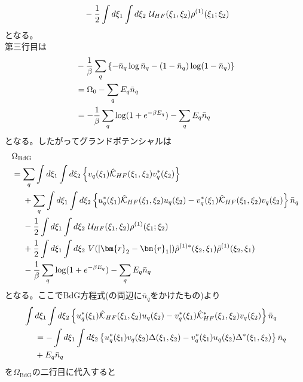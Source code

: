 \documentclass[dvipdfmx, 11pt, a4paper]{jsarticle}
\numberwithin{equation}{section}
\theoremstyle{definition}
\begin{document}
\begin{derivationBox}
\begin{align}
            &\ \ \ \ - \frac{1}{2}\int d\xi_1\int d\xi_2\ \mathcal{U}_{HF}(\xi_1,\xi_2)\rho^{(1)}(\xi_1;\xi_2) \notag 
        \end{align}
        となる。\\
        第三行目は
        \begin{align}
            &- \frac{1}{\beta} \sum_q\left\{ -\bar{n}_q\log \bar{n}_q - (1-\bar{n}_q)\log(1-\bar{n}_q) \right\} \notag \\
            &=\Omega_0 - \sum_q E_q\bar{n}_q \notag \\
            &= -\frac{1}{\beta} \sum_q \log (1 + e^{-\beta E_q}) - \sum_q E_q\bar{n}_q
        \end{align}
        となる。したがってグランドポテンシャルは
        \begin{align}
            &\Omega_{\mathrm{BdG}}\notag \\
            &=\sum_q\int d\xi_1 \int d\xi_2 \left\{  v_q(\xi_1)\hat{\mathcal{K}}_{HF}(\xi_1,\xi_2)v_q^*(\xi_2) \right\}   \notag \\
            &\ \ \ \ +\sum_q\int d\xi_1 \int d\xi_2 \left\{  u_q^*(\xi_1)\hat{\mathcal{K}}_{HF} (\xi_1,\xi_2)u_q(\xi_2)-v_q^*(\xi_1)\hat{\mathcal{K}}_{HF}(\xi_1,\xi_2)v_q(\xi_2) \right\}\bar{n}_q   \notag \\
            &\ \ \ \ - \frac{1}{2}\int d\xi_1\int d\xi_2\ \mathcal{U}_{HF}(\xi_1,\xi_2)\rho^{(1)}(\xi_1;\xi_2) \notag \\
            &\ \ \ \ +\frac{1}{2}\int d\xi_1\int d\xi_2\ V(\left| \bm{r}_2-\bm{r}_1 \right|) \tilde{\rho}^{(1)*}(\xi_2,\xi_1) \tilde{\rho}^{(1)}(\xi_2,\xi_1) \notag \\
            &\ \ \ \ -\frac{1}{\beta} \sum_q \log (1 + e^{-\beta E_q}) - \sum_q E_q\bar{n}_q
        \end{align}
        となる。ここでBdG方程式(の両辺に$\bar{n}_q$をかけたもの)より
        \begin{align}
            &\int d\xi_1\int d\xi_2 \left\{  u_{q}^*(\xi_1)\hat{\mathcal{K}}_{HF}(\xi_1,\xi_2) u_{q}(\xi_2)  -v_{q}^*(\xi_1) \hat{\mathcal{K}}_{HF}^*(\xi_1,\xi_2)  v_{q}(\xi_2) \right\}\bar{n}_q \notag \\
            &\ \ \ \ =- \int d\xi_1 \int d\xi_2 \left\{    u_q^*(\xi_1) v_q(\xi_2)\Delta (\xi_1,\xi_2)   -    v^*_q(\xi_1)u_q(\xi_2)\Delta^* (\xi_1,\xi_2) \right\}\bar{n}_q \notag \\
            &\ \ \ \ +E_q\bar{n}_q
        \end{align}
        を$\Omega_{\mathrm{BdG}}$の二行目に代入すると

\end{derivationBox}
\end{document}
